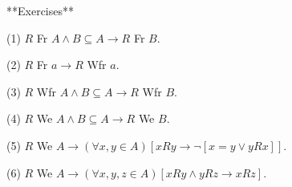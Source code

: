 **Exercises**

(1) $R$ Fr $A \wedge B \subseteq A \rightarrow R$ Fr $B$.

(2) $R$ Fr $a \rightarrow R$ Wfr $a$.

(3) $R$ Wfr $A \wedge B \subseteq A \rightarrow R$ Wfr $B$.

(4) $R$ We $A \wedge B \subseteq A \rightarrow R$ We $B$.

(5) $R$ We $A \rightarrow (\forall x, y \in A)[x R y \rightarrow \neg[x = y \vee y R x]]$.

(6) $R$ We $A \rightarrow (\forall x, y, z \in A)[x R y \wedge y R z \rightarrow x R z]$.
